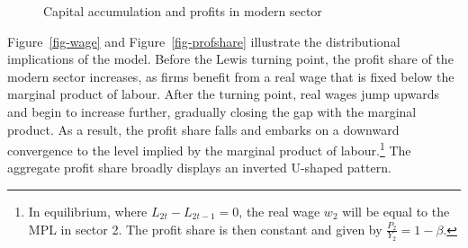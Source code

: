 \documentclass[
  letterpaper,
  DIV=11,
  numbers=noendperiod]{scrreprt}
\begin{document}
\begin{figure}[H]


\caption{\label{fig-capacc}Capital accumulation and profits in modern
sector}

\end{figure}%

Figure~\ref{fig-wage} and Figure~\ref{fig-profshare} illustrate the
distributional implications of the model. Before the Lewis turning
point, the profit share of the modern sector increases, as firms benefit
from a real wage that is fixed below the marginal product of labour.
After the turning point, real wages jump upwards and begin to increase
further, gradually closing the gap with the marginal product. As a
result, the profit share falls and embarks on a downward convergence to
the level implied by the marginal product of labour.\footnote{In
  equilibrium, where \(L_{2t} - L_{2t-1} =0\), the real wage \(w_2\)
  will be equal to the MPL in sector 2. The profit share is then
  constant and given by \(\frac{P{_2}}{Y{_2}} = 1-\beta\).} The
aggregate profit share broadly displays an inverted U-shaped pattern.
\end{document}
